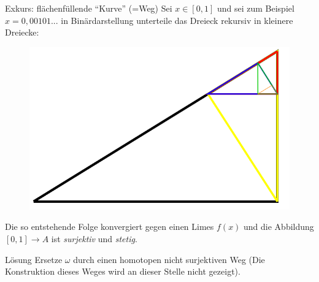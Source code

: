 \documentclass[a4paper,10pt]{scrartcl}
\begin{document}
\begin{exs*}
\begin{enumerate}[(1)]
\begin{seg}{Exkurs: flächenfüllende "`Kurve"' (=Weg)}
Sei $x\in [0,1]$ und sei zum  Beispiel $x=0,00101...$ in Binärdarstellung unterteile das Dreieck rekursiv in kleinere Dreiecke:
\begin{figure}[ht]
\centering
\includegraphics[scale=0.3]{fig60.png}
\end{figure}
Die so entstehende Folge konvergiert gegen einen Limes $f(x)$ und die Abbildung $[0,1]\to A$ ist \emph{surjektiv} und \emph{stetig}.
\end{seg}
\begin{seg}{Lösung}
Ersetze $\omega$ durch einen homotopen nicht surjektiven Weg (Die Konstruktion dieses Weges wird an dieser Stelle nicht gezeigt).
\end{seg}


\end{enumerate}
\end{exs*}
\end{document}

